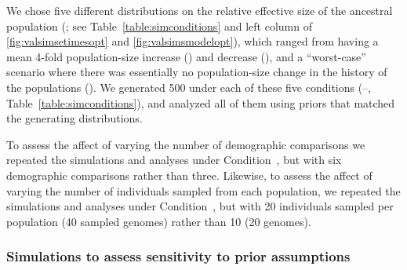 We chose five different distributions on the
relative effective size of the ancestral population
(\rootrelativepopsize;
see Table~\ref{table:simconditions} and left column of
\figs \ref{fig:valsimsetimesopt} and \ref{fig:valsimsmodelopt}),
which ranged from having a mean 4-fold population-size increase (\vsimfourinc)
and decrease (\vsimfourdec),
and a ``worst-case'' scenario
where there was essentially no population-size change in the
history of the populations (\vsimnochange).
We generated 500 \datasets under each of these five conditions
(--, Table~\ref{table:simconditions}),
and analyzed all of them using priors that matched the generating
distributions.

To assess the affect of varying the number of demographic comparisons
we repeated the simulations and analyses under Condition~\vsimfourinc,
but with six demographic comparisons rather than three.
Likewise, to assess the affect of varying the number of individuals sampled
from each population, we repeated the simulations and analyses under
Condition~\vsimfourinc, but with 20 individuals sampled per population (40
sampled genomes) rather than 10 (20 genomes).


\subsubsection{Simulations to assess sensitivity to prior assumptions}


